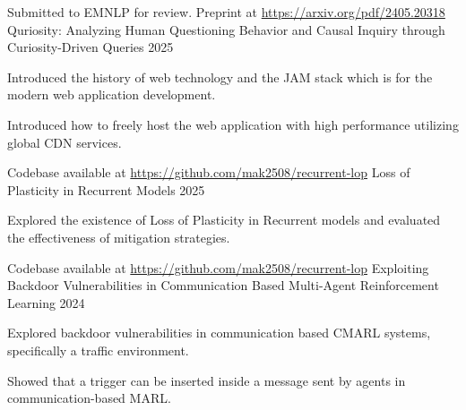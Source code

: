 

\begin{cventries}

  \cventry
    {Submitted to EMNLP for review. Preprint at \url{https://arxiv.org/pdf/2405.20318}} %
    {Quriosity: Analyzing Human Questioning Behavior
and Causal Inquiry through Curiosity-Driven Queries} %
    {} %
    {2025} %
    {
      \begin{cvitems} %
        \item {Introduced the history of web technology and the JAM stack which is for the modern web application development.}
        \item {Introduced how to freely host the web application with high performance utilizing global CDN services.}
      \end{cvitems}
    }

  \cventry
    {Codebase available at \url{https://github.com/mak2508/recurrent-lop}} %
    {Loss of Plasticity in Recurrent Models} %
    {} %
    {2025} %
    {
      \begin{cvitems} %
        \item {Explored the existence of Loss of Plasticity in Recurrent models and evaluated the effectiveness of mitigation strategies.}
      \end{cvitems}
    }

\cventry
{Codebase available at \url{https://github.com/mak2508/recurrent-lop}} %
{Exploiting Backdoor Vulnerabilities in Communication Based Multi-Agent Reinforcement Learning} %
{} %
{2024} %
{
  \begin{cvitems} %
    \item {Explored backdoor vulnerabilities in communication based CMARL systems, specifically a traffic environment.}
    \item {Showed that a trigger can be inserted inside a message sent by agents in communication-based MARL.}
  \end{cvitems}
}


\end{cventries}
